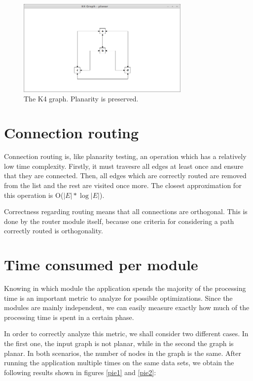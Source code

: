\begin{figure}[ht] \centering
\includegraphics[width=0.75\textwidth]{img/results/k4graph.png}
\caption{The K4 graph. Planarity is preserved. \label{k4}} \end{figure}

\section{Connection routing}

Connection routing is, like planarity testing, an operation which has a relatively low time complexity.
Firstly, it must travesre all edges at least once and ensure that they are connected. Then, all edges which 
are correctly routed are removed from the list and the rest are visited once more. The closest approximation 
for this operation is O($|E| * \log |E|$).

Correctness regarding routing means that all connections are orthogonal. This is done by the router module 
itself, because one criteria for considering a path correctly routed is orthogonality.

\section{Time consumed per module}

Knowing in which module the application spends the majority of the processing time is an important metric 
to analyze for possible optimizations. Since the modules are mainly independent, we can easily measure exactly 
how much of the processing time is spent in a certain phase. 

In order to correctly analyze this metric, we shall consider two different cases. In the first one, the input 
graph is not planar, while in the second the graph is planar. In both scenarios, the number of nodes in the 
graph is the same. After running the application multiple times on the same data sets, we obtain the 
following results shown in figures \ref{pie1} and \ref{pie2}: 


